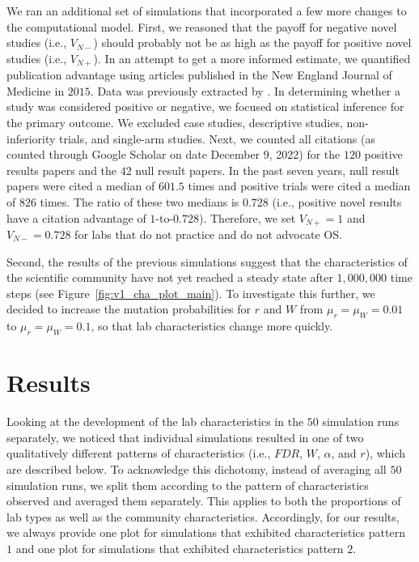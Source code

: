 \documentclass[meta, authordate,issue]{jote-new-article}
\begin{document}
We ran an additional set of simulations that incorporated a few more changes to the computational model. First, we reasoned that the payoff for negative novel studies (i.e., $V_{N-}$) should probably not be as high as the payoff for positive novel studies (i.e., $V_{N+}$). In an attempt to get a more informed estimate, we quantified publication advantage using articles published in the New England Journal of Medicine in $2015$. Data was previously extracted by \textcite{HoekstraMondenVanravenzwaaij_2018}. In determining whether a study was considered positive or negative, we focused on statistical inference for the primary outcome. We excluded case studies, descriptive studies, non-inferiority trials, and single-arm studies. Next, we counted all citations (as counted through Google Scholar on date December 9, 2022) for the $120$ positive results papers and the $42$ null result papers. In the past seven years, null result papers were cited a median of $601.5$ times and positive trials were cited a median of $826$ times. The ratio of these two medians is $0.728$ (i.e., positive novel results have a citation advantage of $1$-to-$0.728$). Therefore, we set $V_{N+}=1$ and $V_{N-}=0.728$ for labs that do not practice and do not advocate OS.

Second, the results of the previous simulations suggest that the characteristics of the scientific community have not yet reached a steady state after $1,000,000$ time steps (see Figure~\ref{fig:v1_cha_plot_main}). To investigate this further, we decided to increase the mutation probabilities for $r$ and $W$ from $\mu_r=\mu_W=0.01$ to $\mu_r=\mu_W=0.1$, so that lab characteristics change more quickly.

\section{Results}

Looking at the development of the lab characteristics in the $50$ simulation runs separately, we noticed that individual simulations resulted in one of two qualitatively different patterns of characteristics (i.e., $FDR$, $W$, $\alpha$, and $r$), which are described below. To acknowledge this dichotomy, instead of averaging all $50$ simulation runs, we split them according to the pattern of characteristics observed and averaged them separately. This applies to both the proportions of lab types as well as the community characteristics. Accordingly, for our results, we always provide one plot for simulations that exhibited characteristics pattern $1$ and one plot for simulations that exhibited characteristics pattern $2$.
\end{document}

